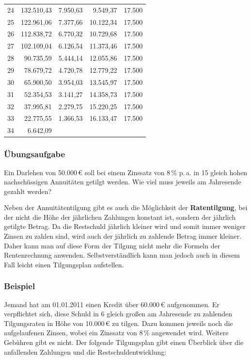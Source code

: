 \begin{center}
\begin{tabular}{rrrrr}
    24 & 132.510{,}43 & 7.950{,}63 & 9.549{,}37 & 17.500\\
    25 & 122.961{,}06 & 7.377{,}66 & 10.122{,}34 & 17.500\\
    26 & 112.838{,}72 & 6.770{,}32 & 10.729{,}68 & 17.500\\
    27 & 102.109{,}04 & 6.126{,}54 & 11.373{,}46 & 17.500\\
    28 & 90.735{,}59 & 5.444{,}14 & 12.055{,}86 & 17.500\\
    29 & 78.679{,}72 & 4.720{,}78 & 12.779{,}22 & 17.500\\
    30 & 65.900{,}50 & 3.954{,}03 & 13.545{,}97 & 17.500\\
    31 & 52.354{,}53 & 3.141{,}27 & 14.358{,}73 & 17.500\\
    32 & 37.995{,}81 & 2.279{,}75 & 15.220{,}25 & 17.500\\
    33 & 22.775{,}55 & 1.366{,}53 & 16.133{,}47 & 17.500\\
    34 & 6.642{,}09 & & & \\
    \hline
  \end{tabular}
\end{center}

\subsubsection{Übungsaufgabe}

\begin{graukasten}
  Ein Darlehen von 50.000\,€ soll bei einem Zinssatz von 8\,\% p.\,a. in 15 gleich hohen nachschüssigen Annuitäten getilgt werden. Wie viel muss jeweils am Jahresende gezahlt werden?
\end{graukasten}

Neben der Annuitätentilgung gibt es auch die Möglichkeit der \textbf{Ratentilgung}, bei der nicht die Höhe der jährlichen Zahlungen konstant ist, sondern der jährlich getilgte Betrag. Da die Restschuld jährlich kleiner wird und somit immer weniger Zinsen zu zahlen sind, wird auch der jährlich zu zahlende Betrag immer kleiner. Daher kann man auf diese Form der Tilgung nicht mehr die Formeln der Rentenrechnung anwenden. Selbstverständlich kann man jedoch auch in diesem Fall leicht einen Tilgungsplan aufstellen.

\subsubsection{Beispiel}

Jemand hat am 01.01.2011 einen Kredit über 60.000\,€ aufgenommen. Er verpflichtet sich, diese Schuld in 6 gleich großen am Jahresende zu zahlenden Tilgungsraten in Höhe von 10.000\,€ zu tilgen. Dazu kommen jeweils noch die aufgelaufenen Zinsen, wobei ein Zinssatz von 8\,\% angewendet wird. Weitere Gebühren gibt es nicht. Der folgende Tilgungsplan gibt einen Überblick über die anfallenden Zahlungen und die Restschuldentwicklung:

